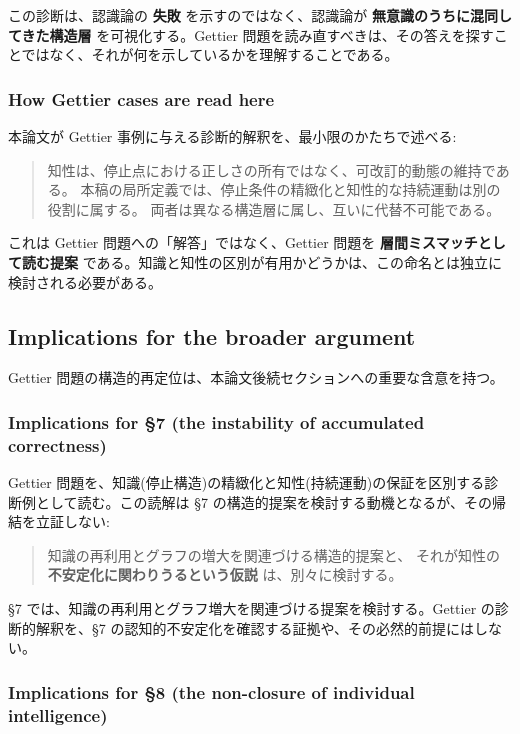 この診断は、認識論の \textbf{失敗} を示すのではなく、認識論が \textbf{無意識のうちに混同してきた構造層} を可視化する。Gettier 問題を読み直すべきは、その答えを探すことではなく、それが何を示しているかを理解することである。

\subsubsection{How Gettier cases are read here}


本論文が Gettier 事例に与える診断的解釈を、最小限のかたちで述べる:

\begin{quote}
知性は、停止点における正しさの所有ではなく、可改訂的動態の維持である。
本稿の局所定義では、停止条件の精緻化と知性的な持続運動は別の役割に属する。
両者は異なる構造層に属し、互いに代替不可能である。
\end{quote}

これは Gettier 問題への「解答」ではなく、Gettier 問題を \textbf{層間ミスマッチとして読む提案} である。知識と知性の区別が有用かどうかは、この命名とは独立に検討される必要がある。

\subsection{Implications for the broader argument}


Gettier 問題の構造的再定位は、本論文後続セクションへの重要な含意を持つ。

\subsubsection{Implications for \S{}7 (the instability of accumulated correctness)}


Gettier 問題を、知識(停止構造)の精緻化と知性(持続運動)の保証を区別する診断例として読む。この読解は \S{}7 の構造的提案を検討する動機となるが、その帰結を立証しない:

\begin{quote}
知識の再利用とグラフの増大を関連づける構造的提案と、
それが知性の \textbf{不安定化に関わりうるという仮説} は、別々に検討する。
\end{quote}

\S{}7 では、知識の再利用とグラフ増大を関連づける提案を検討する。Gettier の診断的解釈を、\S{}7 の認知的不安定化を確認する証拠や、その必然的前提にはしない。

\subsubsection{Implications for \S{}8 (the non-closure of individual intelligence)}


